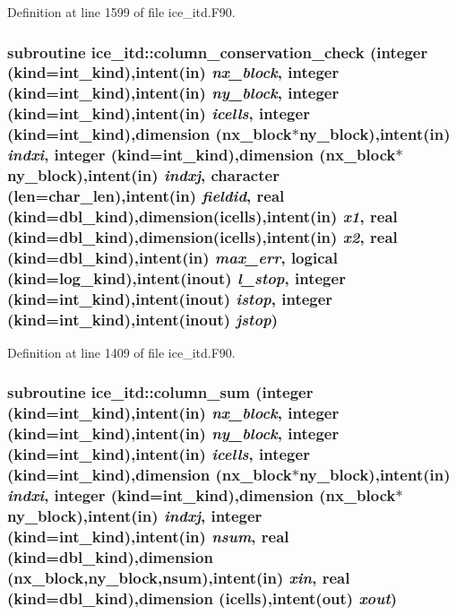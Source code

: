 Definition at line 1599 of file ice\_\-itd.F90.\hypertarget{namespaceice__itd_a6371b4812310c8ffbdf11c024b9e0c5a}{
\subsubsection[{column\_\-conservation\_\-check}]{\setlength{\rightskip}{0pt plus 5cm}subroutine ice\_\-itd::column\_\-conservation\_\-check (integer (kind=int\_\-kind),intent(in) {\em nx\_\-block}, \/  integer (kind=int\_\-kind),intent(in) {\em ny\_\-block}, \/  integer (kind=int\_\-kind),intent(in) {\em icells}, \/  integer (kind=int\_\-kind),dimension (nx\_\-block$\ast$ny\_\-block),intent(in) {\em indxi}, \/  integer (kind=int\_\-kind),dimension (nx\_\-block$\ast$ny\_\-block),intent(in) {\em indxj}, \/  character (len=char\_\-len),intent(in) {\em fieldid}, \/  real (kind=dbl\_\-kind),dimension(icells),intent(in) {\em x1}, \/  real (kind=dbl\_\-kind),dimension(icells),intent(in) {\em x2}, \/  real (kind=dbl\_\-kind),intent(in) {\em max\_\-err}, \/  logical (kind=log\_\-kind),intent(inout) {\em l\_\-stop}, \/  integer (kind=int\_\-kind),intent(inout) {\em istop}, \/  integer (kind=int\_\-kind),intent(inout) {\em jstop})}}
\label{namespaceice__itd_a6371b4812310c8ffbdf11c024b9e0c5a}


Definition at line 1409 of file ice\_\-itd.F90.\hypertarget{namespaceice__itd_acc3eccaeb97f8a721fd0b9127b1fa183}{
\subsubsection[{column\_\-sum}]{\setlength{\rightskip}{0pt plus 5cm}subroutine ice\_\-itd::column\_\-sum (integer (kind=int\_\-kind),intent(in) {\em nx\_\-block}, \/  integer (kind=int\_\-kind),intent(in) {\em ny\_\-block}, \/  integer (kind=int\_\-kind),intent(in) {\em icells}, \/  integer (kind=int\_\-kind),dimension (nx\_\-block$\ast$ny\_\-block),intent(in) {\em indxi}, \/  integer (kind=int\_\-kind),dimension (nx\_\-block$\ast$ny\_\-block),intent(in) {\em indxj}, \/  integer (kind=int\_\-kind),intent(in) {\em nsum}, \/  real (kind=dbl\_\-kind),dimension (nx\_\-block,ny\_\-block,nsum),intent(in) {\em xin}, \/  real (kind=dbl\_\-kind),dimension (icells),intent(out) {\em xout})}}
\label{namespaceice__itd_acc3eccaeb97f8a721fd0b9127b1fa183}


